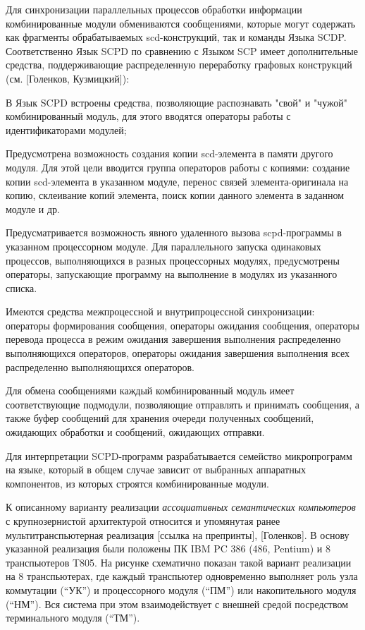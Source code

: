 \begin{textitemize}
	\item Для синхронизации параллельных процессов обработки информации комбинированные модули обмениваются сообщениями, которые могут содержать как фрагменты обрабатываемых scd-конструкций, так и команды Языка SCDP. Соответственно Язык SCPD по сравнению с Языком SCP имеет дополнительные средства, поддерживающие распределенную переработку графовых конструкций (см. [Голенков, Кузмицкий]):
	\begin{textitemize}
		\item В Язык SCPD встроены средства, позволяющие распознавать "свой"{} и "чужой"{} комбинированный модуль, для этого вводятся операторы работы с идентификаторами модулей;
		\item Предусмотрена возможность создания копии scd-элемента в памяти другого модуля. Для этой цели вводится группа операторов работы с копиями: создание копии scd-элемента в указанном модуле, перенос связей элемента-оригинала на копию, склеивание копий элемента, поиск копии данного элемента в заданном модуле и др.
		\item Предусматривается возможность явного удаленного вызова scpd-программы в указанном процессорном модуле. Для параллельного запуска одинаковых процессов, выполняющихся в разных процессорных модулях, предусмотрены операторы, запускающие программу на выполнение в модулях из указанного списка.
		\item Имеются средства межпроцессной и внутрипроцессной синхронизации: операторы формирования сообщения, операторы ожидания сообщения, операторы перевода процесса в режим ожидания завершения выполнения распределенно выполняющихся операторов, операторы ожидания завершения выполнения всех распределенно выполняющихся операторов.
	\end{textitemize}
	\item Для обмена сообщениями каждый комбинированный модуль имеет соответствующие подмодули, позволяющие отправлять и принимать сообщения, а также буфер сообщений для хранения очереди полученных сообщений, ожидающих обработки и сообщений, ожидающих отправки.
	\item Для интерпретации SCPD-программ разрабатывается семейство микропрограмм на языке, который в общем случае зависит от выбранных аппаратных компонентов, из которых строятся комбинированные модули.
\end{textitemize}

К описанному варианту реализации \textit{ассоциативных семантических компьютеров} с крупнозернистой архитектурой относится и упомянутая ранее мультитранспьютерная реализация  [ссылка на препринты], [Голенков]. В основу указанной реализация были положены ПК IBM PC 386 (486, Pentium) и 8 транспьютеров T805. На рисунке \textit{} схематично показан такой вариант реализации на 8 транспьютерах, где каждый транспьютер одновременно выполняет роль узла коммутации (``УК'') и процессорного модуля (``ПМ'') или накопительного модуля (``НМ''). Вся система при этом взаимодействует с внешней средой посредством терминального модуля (``ТМ'').


